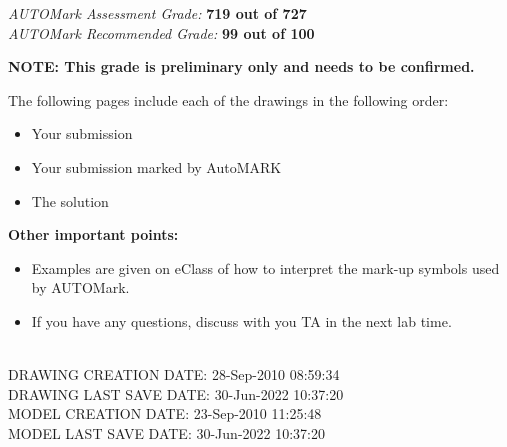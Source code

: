 \documentclass{article}
\begin{document}
\begin{center}
 \large \emph {{AUTOMark Assessment Grade:}}
 \large \textbf{719 out of 727}\\[0.5 cm] %
 \large \emph {{AUTOMark Recommended Grade:}}
 \large \textbf{99 out of 100}\\[0.5 cm] %
\end{center}
\vspace{1.0\baselineskip} %
\begin{flushleft}
\textbf{NOTE: This grade is preliminary only and needs to be confirmed.}\\[1.0 cm] %
\end{flushleft}
The following pages include each of the drawings in the following order:
\begin{itemize}
\itemsep0em %
	\item Your submission 
	\item Your submission marked by AutoMARK
	\item The solution
\end{itemize}
%
\textbf{Other important points:}
\begin{itemize}
\itemsep0em %
	\item Examples are given on eClass of how to interpret the mark-up symbols used by AUTOMark.
	\item If you have any questions, discuss with you TA in the next lab time.
\end{itemize}

\begin{flushleft} \large
\\[0.5cm]
DRAWING CREATION DATE: {28-Sep-2010 08:59:34}\\
DRAWING LAST SAVE DATE: {30-Jun-2022 10:37:20}\\
MODEL CREATION DATE: {23-Sep-2010 11:25:48}\\
MODEL LAST SAVE DATE: {30-Jun-2022 10:37:20}\\
\end{flushleft}
\end{document}
